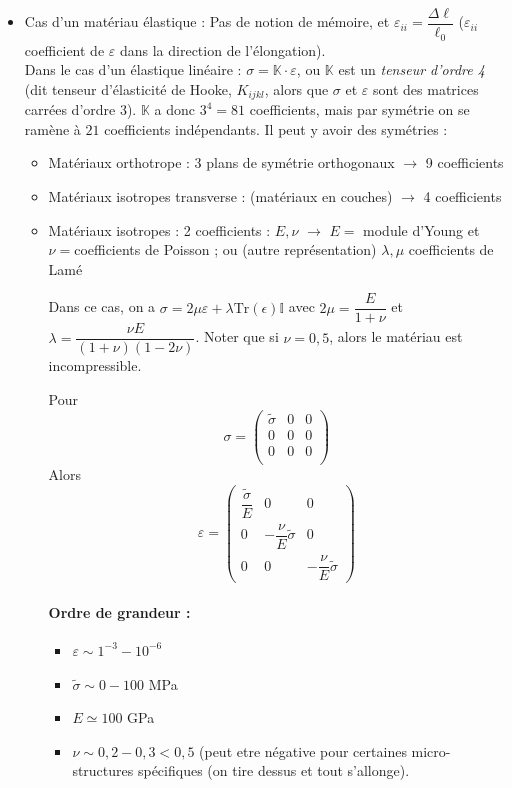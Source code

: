 \documentclass{article}
\begin{document}
\begin{itemize}
\item Cas d'un matériau élastique : Pas de notion de mémoire, et $\varepsilon_{ii} = \dfrac{\Delta \ell}{\ell_0}$ ($\varepsilon_{ii}$ coefficient de $\varepsilon$ dans la direction de l'élongation).\\
Dans le cas d'un élastique linéaire : $\sigma = \mathbb{K}\cdot\varepsilon$, ou $\mathbb{K}$ est un \emph{tenseur d'ordre 4} (dit tenseur d'élasticité de Hooke, $K_{ijkl}$, alors que $\sigma$ et $\varepsilon$ sont des matrices carrées d'ordre 3). $\mathbb{K}$ a donc $3^4=81$ coefficients, mais par symétrie on se ramène à $21$ coefficients indépendants. Il peut y avoir des symétries :
\begin{itemize}[label=\textbullet]
\item Matériaux orthotrope : 3 plans de symétrie orthogonaux $\to$ 9 coefficients
\item Matériaux isotropes transverse : (matériaux en couches) $\to$ 4 coefficients
\item Matériaux isotropes : 2 coefficients : $E,\nu$ $\to$ $E=$ module d'Young et $\nu=$coefficients de Poisson ; ou (autre représentation) $\lambda,\mu$ coefficients de Lamé

Dans ce cas, on a $\sigma = 2\mu \varepsilon + \lambda \text{Tr}(\epsilon) \mathbb{I}$ avec $2\mu = \dfrac{E}{1+\nu}$ et $\lambda = \dfrac{\nu E}{(1+\nu)(1-2\nu)}$. Noter que si $\nu = 0,5$, alors le matériau est incompressible.

Pour
\[
\sigma = \begin{pmatrix}
\tilde{\sigma} & 0 & 0\\
0 & 0 & 0\\
0 & 0 & 0\\
\end{pmatrix}
\]
Alors 
\[\varepsilon = 
\begin{pmatrix}
\dfrac{\tilde{\sigma}}{E} & 0 & 0\\
0 & -\dfrac{\nu}{E}\tilde{\sigma} & 0\\
0 & 0 & -\dfrac{\nu}{E}\tilde{\sigma}
\end{pmatrix}
\]
\paragraph{Ordre de grandeur :}
\begin{itemize}[label=$\star$]
\item $\varepsilon \sim 1^{-3}-10^{-6}$
\item $\tilde{\sigma}\sim 0-100$ MPa
\item $E \simeq 100$ GPa
\item $\nu \sim 0,2 - 0,3 < 0,5$ (peut etre négative pour certaines micro-structures spécifiques (on tire dessus et tout s'allonge).
\end{itemize}
\end{itemize}
\end{itemize}
\end{document}
